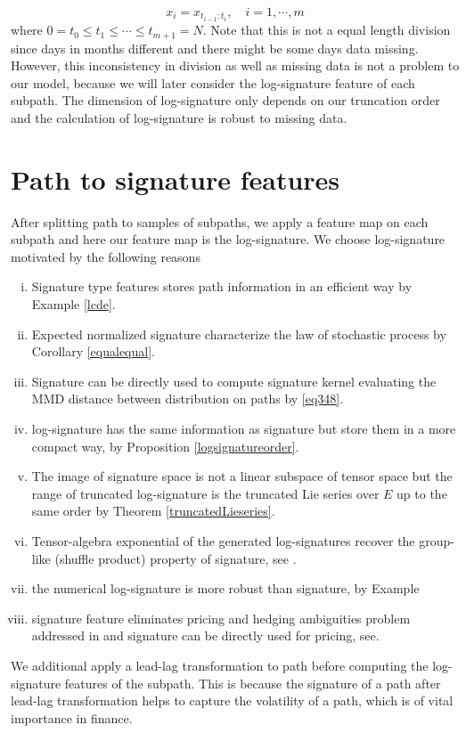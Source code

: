 \documentclass[12pt]{report}
\theoremstyle{definition}
\theoremstyle{remark}
\begin{document}
\begin{equation*}
  x_{i} = x_{t_{i-1}:t_{i}}, \quad i = 1,\cdots,m
\end{equation*}
where $0 = t_{0} \leq t_{1} \leq \cdots \leq t_{m+1} = N$. Note that this is not a equal length division since days in months different and there might be some days data missing. However, this inconsistency in division as well as missing data is not a problem to our model, because we will later consider the log-signature feature of each subpath. The dimension of log-signature only depends on our truncation order and the calculation of log-signature is robust to missing data. 
\section{Path to signature features}
After splitting path to samples of subpaths, we apply a feature map on each subpath and here our feature map is the log-signature. We choose log-signature motivated by the following reasons
\begin{enumerate}[(i)]
  \item Signature type features stores path information in an efficient way by Example \ref{lcde}.
  \item Expected normalized signature characterize the law of stochastic process by Corollary \ref{equalequal}.
  \item Signature can be directly used to compute signature kernel evaluating the MMD distance between distribution on paths by \eqref{eq348}.
  \item log-signature has the same information as signature but store them in a more compact way, by Proposition \ref{logsignatureorder}. 
  \item The image of signature space is not a linear subspace of tensor space but the range of truncated log-signature is the truncated Lie series over $E$ up to the same order by Theorem \ref{truncatedLieseries}.
  \item Tensor-algebra exponential of the generated log-signatures recover the group-like (shuffle product) property of signature, see \cite{lyons2007differential}.
  \item the numerical log-signature is more robust than signature, by Example  
  \item signature feature eliminates pricing and hedging ambiguities problem addressed in and signature can be directly used for pricing, see.
\end{enumerate} 
We additional apply a lead-lag transformation \cite{flint2016discretely} to path before computing the log-signature features of the subpath. This is because the signature of a path after lead-lag transformation helps to capture the volatility of a path, which is of vital importance in finance. 
\end{document}
